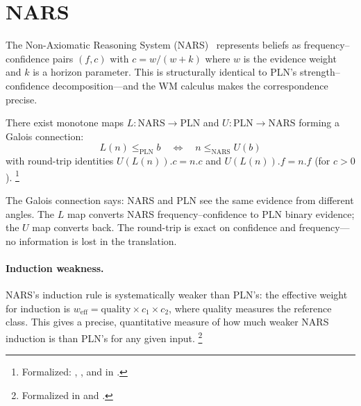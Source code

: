\documentclass[11pt,openany]{report}
\begin{document}
\section{NARS}
\label{sec:bridge-nars}

The Non-Axiomatic Reasoning System
(NARS)~\cite{Wang2006NARS} represents beliefs as
frequency--confidence pairs $(f, c)$ with
$c = w / (w + k)$ where $w$ is the evidence weight and
$k$ is a horizon parameter.  This is structurally identical to
PLN's strength--confidence decomposition---and the WM calculus
makes the correspondence precise.

\begin{theorem}
\label{thm:nars-galois}
There exist monotone maps $L : \mathrm{NARS} \to \mathrm{PLN}$
and $U : \mathrm{PLN} \to \mathrm{NARS}$ forming a Galois
connection:
\[
  L(n) \le_{\mathrm{PLN}} b
  \quad\Longleftrightarrow\quad
  n \le_{\mathrm{NARS}} U(b)
\]
with round-trip identities
$U(L(n)).c = n.c$ and $U(L(n)).f = n.f$ (for $c > 0$).%
\footnote{Formalized:
,
, and
 in
.}
\end{theorem}

\noindent
The Galois connection says: NARS and PLN see the same evidence
from different angles.  The $L$ map converts NARS
frequency--confidence to PLN binary evidence; the $U$ map
converts back.  The round-trip is exact on confidence and
frequency---no information is lost in the translation.

\paragraph{Induction weakness.}
NARS's induction rule is systematically weaker than PLN's:
the effective weight for induction is
$w_{\mathrm{eff}} = \mathrm{quality} \times c_1 \times c_2$,
where quality measures the reference class.  This gives a
precise, quantitative measure of how much weaker NARS
induction is than PLN's for any given input.%
\footnote{Formalized in
and
.}

\end{document}
